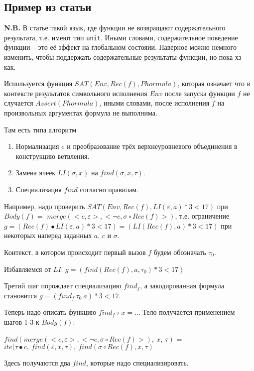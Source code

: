 \documentclass[a5paper,12pt]{article}
\begin{document}
\subsection{Пример из статьи}

\textbf{N.B.} В статье такой язык, где функции не возвращают содержательного результата, т.е. имеют тип \texttt{unit}. Иными словами, содержательное поведение функции -- это её эффект на глобальном состояии. Наверное можно немного изменить, чтобы поддержать содержательные результаты функции, но пока хз как.

Используется функция $SAT(Env, Rec(f), Phormula)$, которая означает что в контексте результатов символьного исполнения $Env$ после запуска функции $f$ не случается $Assert(Phormula)$, иными словами, после исполнения $f$ на произвольных аргументах формула не выполнима.

Там есть типа алгоритм
\begin{enumerate}
  \item Нормализация $e$ и преобразование трёх верхнеуровневого объединения в конструкцию ветвления.
  \item Замена ячеек $LI(\sigma,x)$  на  $find(\sigma, x, \tau)$.
  \item Специализация $find$ согласно правилам.
\end{enumerate}

Например, надо проверить $SAT(Env, Rec(f), LI(\varepsilon, a) * 3< 17)$ при $Body(f) = $
$merge(<c,\varepsilon>, <\neg c, \sigma \circ Rec(f)>)$, т.е. ограничение 
$g = (Rec(f)\bullet LI(\varepsilon,a)*3<17) = (LI(Rec(f), a)*3 < 17)$ при некоторых наперед заданных $a$, $c$ и $\sigma$.

Контекст, в котором происходит первый вызов $f$ будем обозначать $\tau_0$.

Избавляемся от $LI$: $g = (find(Rec(f), a, \tau_0)*3 < 17)$

Третий шаг порождает специализацию $find_f$, а закодированная формула становится 
$g = (find_f\ \tau_0\ a)*3 < 17$.

Теперь надо описать функцию $find_f\ \tau\ x = ... $ Тело получается применением шагов 1-3 к $Body(f)$: 

\begin{center}
$find( merge(<c,\varepsilon>, <\neg c, \sigma \circ Rec(f)>),\ x,\ \tau)$ = 
 $ite(\tau\bullet c,\ find(\varepsilon,x,\tau),\ find(\sigma\circ Rec(f),x,\tau)$
\end{center}
Здесь получаются два $find$, которые надо специализировать.
\end{document}
